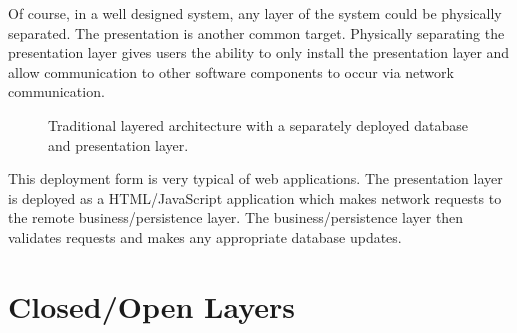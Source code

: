 Of course, in a well designed system, any layer of the system could be physically separated.
The presentation is another common target.
Physically separating the presentation layer gives users the ability to only install the presentation layer and allow communication to
other software components to occur via network communication.

\begin{figure}[h]
    \centering
    \caption{Traditional layered architecture with a separately deployed database and presentation layer.}
    \label{fig:layered-db-pres-separated}
\end{figure}

This deployment form is very typical of web applications.
The presentation layer is deployed as a HTML/JavaScript application which makes network requests to the remote business/persistence layer.
The business/persistence layer then validates requests and makes any appropriate database updates.


\section{Closed/Open Layers}